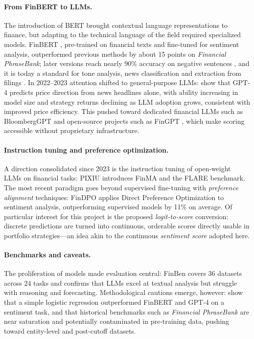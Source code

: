 \documentclass[a4paper,11pt]{article}
\begin{document}
\paragraph{From FinBERT to LLMs.} The introduction of BERT \parencite{devlin2018bert} brought contextual language representations to finance, but adapting to the technical language of the field required specialized models. FinBERT \parencite{araci2019finbert}, pre-trained on financial texts and fine-tuned for sentiment analysis, outperformed previous methods by about 15 points on \textit{Financial PhraseBank}; later versions reach nearly 90\% accuracy on negative sentences \parencite{huang2022finbert}, and it is today a standard for tone analysis, news classification and extraction from filings \parencite{gu2024finbert}. In 2022--2023 attention shifted to general-purpose LLMs: \textcite{lopezlira2024chatgptforecaststockprice} show that GPT-4 predicts price direction from news headlines alone, with ability increasing in model size and strategy returns declining as LLM adoption grows, consistent with improved price efficiency. This pushed toward dedicated financial LLMs such as BloombergGPT \parencite{wu2023bloomberggptlargelanguagemodel} and open-source projects such as FinGPT \parencite{yang2023fingptopensourcefinanciallarge}, which make scoring accessible without proprietary infrastructure.

\paragraph{Instruction tuning and preference optimization.} A direction consolidated since 2023 is the instruction tuning of open-weight LLMs on financial tasks: PIXIU \parencite{xie2023pixiu} introduces FinMA and the FLARE benchmark. The most recent paradigm goes beyond supervised fine-tuning with \textit{preference alignment} techniques: FinDPO \parencite{iacovides2025findpo} applies Direct Preference Optimization to sentiment analysis, outperforming supervised models by 11\% on average. Of particular interest for this project is the proposed \textit{logit-to-score} conversion: discrete predictions are turned into continuous, orderable scores directly usable in portfolio strategies---an idea akin to the continuous \textit{sentiment score} adopted here.

\paragraph{Benchmarks and caveats.} The proliferation of models made evaluation central: FinBen \parencite{xie2024finben} covers 36 datasets across 24 tasks and confirms that LLMs excel at textual analysis but struggle with reasoning and forecasting. Methodological cautions emerge, however: \textcite{bdcc8110143} show that a simple logistic regression outperformed FinBERT and GPT-4 on a sentiment task, and that historical benchmarks such as \textit{Financial PhraseBank} are near saturation and potentially contaminated in pre-training data, pushing toward entity-level \parencite{tang-etal-2023-finentity} and post-cutoff datasets.
\end{document}
